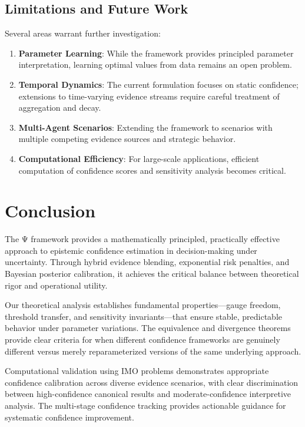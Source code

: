 \documentclass[12pt,a4paper]{article}
\begin{document}
\subsection{Limitations and Future Work}

Several areas warrant further investigation:

\begin{enumerate}
\item \textbf{Parameter Learning}: While the framework provides principled parameter interpretation, learning optimal values from data remains an open problem.

\item \textbf{Temporal Dynamics}: The current formulation focuses on static confidence; extensions to time-varying evidence streams require careful treatment of aggregation and decay.

\item \textbf{Multi-Agent Scenarios}: Extending the framework to scenarios with multiple competing evidence sources and strategic behavior.

\item \textbf{Computational Efficiency}: For large-scale applications, efficient computation of confidence scores and sensitivity analysis becomes critical.
\end{enumerate}

\section{Conclusion}

The Ψ framework provides a mathematically principled, practically effective approach to epistemic confidence estimation in decision-making under uncertainty. Through hybrid evidence blending, exponential risk penalties, and Bayesian posterior calibration, it achieves the critical balance between theoretical rigor and operational utility.

Our theoretical analysis establishes fundamental properties—gauge freedom, threshold transfer, and sensitivity invariants—that ensure stable, predictable behavior under parameter variations. The equivalence and divergence theorems provide clear criteria for when different confidence frameworks are genuinely different versus merely reparameterized versions of the same underlying approach.

Computational validation using IMO problems demonstrates appropriate confidence calibration across diverse evidence scenarios, with clear discrimination between high-confidence canonical results and moderate-confidence interpretive analysis. The multi-stage confidence tracking provides actionable guidance for systematic confidence improvement.
\end{document}
